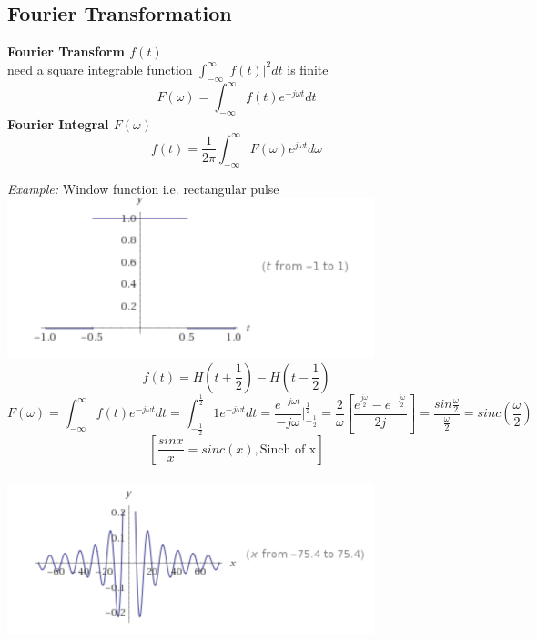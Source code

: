 \documentclass[11pt]{article}
\theoremstyle{definition}
\begin{document}
\clearpage
\subsection{Fourier Transformation}
\textbf{Fourier Transform $f(t)$}\\
need a square integrable function $\int^{\infty}_{-\infty}|f(t)|^2dt$ is finite\\
$$F(\omega) = \int^{\infty}_{-\infty} f(t)e^{-j\omega t}dt$$
\textbf{Fourier Integral $F(\omega)$}\\
$$f(t) = \frac{1}{2\pi}\int^{\infty}_{-\infty} F(\omega)e^{j\omega t}d\omega$$

\textit{Example:}
Window function i.e. rectangular pulse\\
\includegraphics[width=0.8\textwidth]{windowfunction.png}\\
$$f(t) = H(t+\frac{1}{2}) - H(t-\frac{1}{2})$$
$$F(\omega) = \int^{\infty}_{-\infty} f(t) e^{-j\omega t}dt = \int_{-\frac{1}{2}}^{\frac{1}{2}}1e^{-j\omega t}dt = \frac{e^{-j\omega t}}{-j \omega}|^\frac{1}{2}_{-\frac{1}{2}} = \frac{2}{\omega}[\frac{e^{\frac{j\omega}{2}} - e^{-\frac{j\omega}{2}}}{2j}] = \frac{sin \frac{\omega}{2}}{\frac{\omega }{2}} = sinc(\frac{\omega}{2})$$
$$[\frac{sinx}{x} = sinc(x), \text{Sinch of x}]$$\\
\includegraphics[width=0.8\textwidth]{sincx.png}\\
\end{document}
